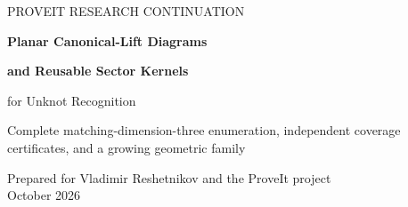 \documentclass[11pt,a4paper]{article}
\theoremstyle{definition}
\begin{document}
\hypersetup{pageanchor=false}
\begin{titlepage}
\vspace*{0mm}
{\color{teal}\large PROVEIT RESEARCH CONTINUATION\par}
\vspace{8mm}
{\color{ink}\Huge\bfseries Planar Canonical-Lift Diagrams\par}
\vspace{3mm}
{\color{ink}\huge\bfseries and Reusable Sector Kernels\par}
\vspace{5mm}
{\color{ink}\Large for Unknot Recognition\par}
\vspace{8mm}
{\large Complete matching-dimension-three enumeration, independent
coverage certificates, and a growing geometric family\par}
\vspace{6mm}
{\normalsize Prepared for Vladimir Reshetnikov and the ProveIt project\\
October 2026\par}
\vspace{4mm}
\begin{abstract}
We extend the preceding minimum-envelope method from matching nullity at
most two to at most three.  For one supplied quadrilateral sector with
\(k\) allowed types, contraction of zero-labelled face equations leaves
at most \(8k\) triangle classes.  Its canonical standard-coordinate lift
is linear on the common refinement of planar minimum diagrams.  We prove
the explicit output bound
\[
 R\le b+2\sum_v(m_v-1)
       +9\sum_{v<w}(m_v-1)(m_w-1)=O(k^2),
\]
including degeneracies and a linear bound when only one vertex group
has a nontrivial diagram.  A simple exact implementation constructs all
rays in \(O(k^3+tk^2)\) scalar operations after matching elimination,
where \(t\) is the number of tetrahedra; integer normalization and bit
length are charged separately.  We also prove completeness of a compact
certificate based on dominance inequalities and exact area or length,
and reduce reusable pre-elimination sector construction to
\(O(t\log(t+1)+k^2)\) elementary integer work.


\end{abstract}
\end{titlepage}
\end{document}
